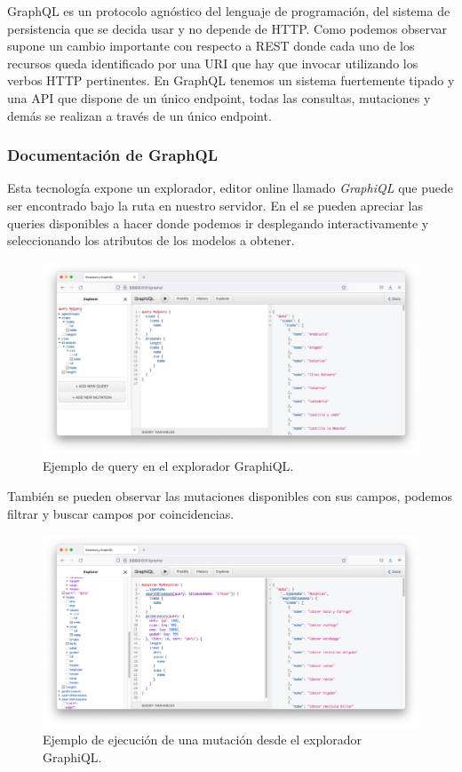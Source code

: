 GraphQL es un protocolo agnóstico del lenguaje de programación, del sistema de
persistencia que se decida usar y no depende de HTTP. Como podemos observar supone un
cambio importante con respecto a REST donde cada uno de los recursos queda identificado
por una URI que hay que invocar utilizando los verbos HTTP pertinentes. En GraphQL tenemos
un sistema fuertemente tipado y una API que dispone de un único endpoint, todas las
consultas, mutaciones y demás se realizan a través de un único endpoint.

\subsubsection{Documentación de GraphQL}
Esta tecnología expone un explorador, editor online llamado \textit{GraphiQL} que puede
ser encontrado bajo la ruta  en nuestro servidor. En el se pueden
apreciar las queries disponibles a hacer donde podemos ir desplegando interactivamente y
seleccionando los atributos de los modelos a obtener.

\FloatBarrier
\begin{figure}[h]
	\centering	
	\includegraphics[width=\textwidth]{doc/logos/imgs/queries-graph.jpg}
	\caption{ Ejemplo de query en el explorador GraphiQL. }
    \label{fig:graficos-GraphiQL}
\end{figure}
\FloatBarrier

También se pueden observar las mutaciones disponibles con sus campos, podemos filtrar y
buscar campos por coincidencias.

\FloatBarrier
\begin{figure}[h]
	\centering	
	\includegraphics[width=\textwidth]{doc/logos/imgs/mutaciones-graph.png}
	\caption{ Ejemplo de ejecución de una mutación desde el explorador GraphiQL. }
    \label{fig:graficos-GraphiQL}
\end{figure}
\FloatBarrier

